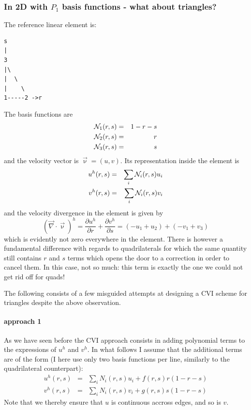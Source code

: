 \subsubsection{In 2D with $P_1$ basis functions - what about triangles?}


The reference linear element is: 
\begin{verbatim}
s
|
3
|\
|  \
|    \
1-----2 ->r
\end{verbatim}

The basis functions are 
\begin{eqnarray}
{\mathcal{N}}_1(r,s) &=& 1-r-s \nonumber\\
{\mathcal{N}}_2(r,s) &=& r \nonumber\\
{\mathcal{N}}_3(r,s) &=& s 
\end{eqnarray}
and the velocity vector is $\vec\upnu=(u,v)$. 
Its representation inside the element is 
\begin{eqnarray}
u^h(r,s)&=&\sum_i {\mathcal{N}}_i(r,s) u_i \nonumber\\
v^h(r,s)&=&\sum_i {\mathcal{N}}_i(r,s) v_i \nonumber
\end{eqnarray}
and the velocity divergence in the element is given by
\[
(\vec\nabla\cdot\vec\upnu)^h = 
\frac{\partial u^h}{\partial r}
+
\frac{\partial v^h}{\partial s}
=(-u_1+u_2)+(-v_1+v_3)
\]
which is evidently not zero everywhere in the element.
There is however a fundamental difference with regards to quadrilaterals
for which the same quantity still contains $r$ and $s$ terms which 
opens the door to a correction in order to cancel them.
In this case, not so much: this term is exactly the one
we could not get rid off for quads!

The following consists of a few misguided attempts at designing a 
CVI scheme for triangles despite the above observation.

\paragraph{approach 1}
As we have seen before the CVI approach consists in adding polynomial 
terms to the expressions of $u^h$ and $v^h$.
In what follows I assume that the additional terms are of the form 
(I here use only two basis functions per line, similarly to the quadrilateral counterpart):
\begin{eqnarray}
u^h(r,s)&=&\sum_i N_i(r,s) u_i + f(r,s) r(1-r-s) \\
v^h(r,s)&=&\sum_i N_i(r,s) v_i + g(r,s) s(1-r-s) 
\end{eqnarray}
Note that we thereby ensure that $u$ is continuous accross edges, and so is $v$.

